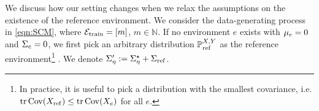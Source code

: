 

We discuss how our setting changes when we relax the assumptions on the existence of the reference environment. We consider the data-generating process in \cref{eqn:SCM}, where $\mathcal{E}_{\mathrm{train}} = [m]$, $m \in \mathbb{N}$. If no environment $e$ exists with $\mu_e = 0$ and $\Sigma_e = 0$, we first pick an arbitrary distribution $\mathbb{P}_{\mathrm{ref}}^{X,Y}$ as the reference environment\footnote{In practice, it is useful to pick a distribution with the smallest covariance, i.e. $\mathrm{tr}\, \mathrm{Cov}(X_{\mathrm{ref}}) \leq \mathrm{tr}\, \mathrm{Cov}(X_e)$ for all $e$.} .
We denote $\Sigma_{\eta}' := \Sigma^\star_{\eta} + \Sigma_{\mathrm{ref}}$. 

